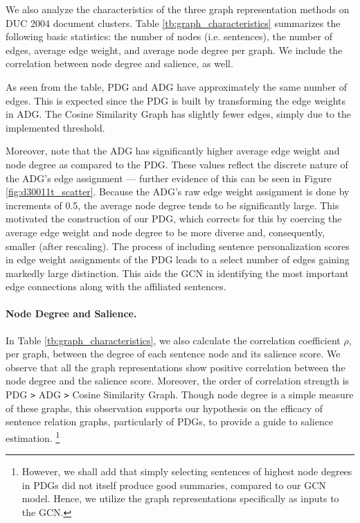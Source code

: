 \documentclass[11pt,a4paper]{article}
\begin{document}
We also analyze the characteristics of the three graph representation methods on DUC 2004 document clusters.
Table \ref{tb:graph_characteristics} summarizes the following basic statistics: 
the number of nodes (i.e. sentences), the number of edges, average edge weight, and average node degree per graph. We include the correlation between node degree and salience, as well.

As seen from the table, PDG and ADG have approximately the same number of edges. This is expected since the PDG is built by transforming the edge weights in ADG. The Cosine Similarity Graph has slightly fewer edges, simply due to the implemented threshold.

Moreover, note that the ADG has significantly higher average edge weight and node degree as compared to the PDG. These values reflect the discrete nature of the ADG's edge assignment --- further evidence of this can be seen in Figure \ref{fig:d30011t_scatter}. Because the ADG's raw edge weight assignment is done by increments of 0.5, the average node degree tends to be significantly large. This motivated the construction of our PDG, which corrects for this by coercing the average edge weight and node degree to be more diverse and, consequently, smaller (after rescaling).
The process of including sentence personalization scores in edge weight assignments of the PDG leads to a select number of edges gaining markedly large distinction. This aids the GCN in identifying the most important edge connections along with the affiliated sentences.


\paragraph{Node Degree and Salience.}
In Table \ref{tb:graph_characteristics}, we also calculate the correlation coefficient $\rho$, per graph, between the degree of each sentence node and its salience score.
We observe that all the graph representations show positive correlation between the node degree and the salience score.
Moreover, the order of correlation strength is PDG \verb|>| ADG  \verb|>| Cosine Similarity Graph.
Though node degree is a simple measure of these graphs, this observation supports our hypothesis on the efficacy of sentence relation graphs, particularly of PDGs, to provide a guide to salience estimation.
\footnote{
However, we shall add that simply selecting sentences of highest node degrees in PDGs did not itself produce good summaries, compared to our GCN model. Hence, we utilize the graph representations specifically as inputs to the GCN.}
\end{document}
